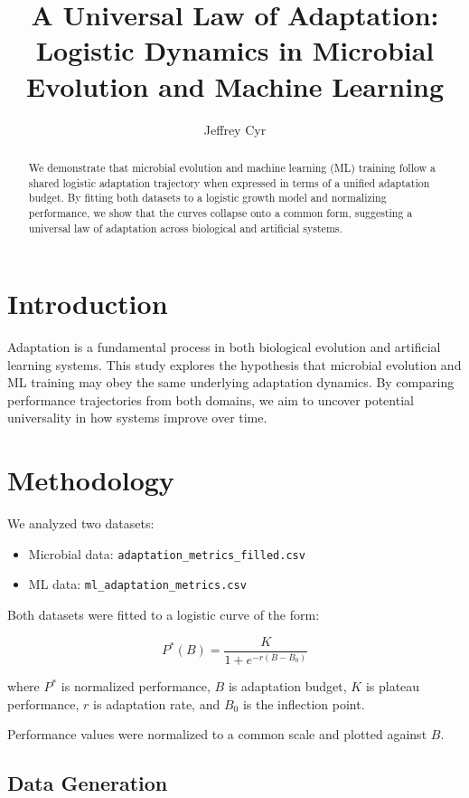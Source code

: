 \documentclass[11pt]{article}
\title{A Universal Law of Adaptation: Logistic Dynamics in Microbial Evolution and Machine Learning}
\author{Jeffrey Cyr}
\affil{Independent Researcher}
\date{}
\begin{document}
	\maketitle
	
	\begin{abstract}
		We demonstrate that microbial evolution and machine learning (ML) training follow a shared logistic adaptation trajectory when expressed in terms of a unified adaptation budget. By fitting both datasets to a logistic growth model and normalizing performance, we show that the curves collapse onto a common form, suggesting a universal law of adaptation across biological and artificial systems.
	\end{abstract}
	
	\section{Introduction}
	Adaptation is a fundamental process in both biological evolution and artificial learning systems. This study explores the hypothesis that microbial evolution and ML training may obey the same underlying adaptation dynamics. By comparing performance trajectories from both domains, we aim to uncover potential universality in how systems improve over time.
	
	\section{Methodology}
	We analyzed two datasets:
	\begin{itemize}
		\item Microbial data: \texttt{adaptation\_metrics\_filled.csv}
		\item ML data: \texttt{ml\_adaptation\_metrics.csv}
	\end{itemize}
	
	Both datasets were fitted to a logistic curve of the form:
	
	
	\[
	P^*(B) = \frac{K}{1 + e^{-r(B - B_0)}}
	\]
	
	
	where \(P^*\) is normalized performance, \(B\) is adaptation budget, \(K\) is plateau performance, \(r\) is adaptation rate, and \(B_0\) is the inflection point.
	
	Performance values were normalized to a common scale and plotted against \(B\).
	
	\subsection*{Data Generation}
	
\end{document}
